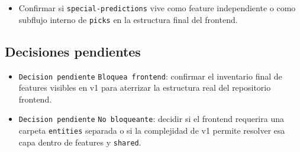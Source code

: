\begin{itemize}
  \item Confirmar si \texttt{special-predictions} vive como feature independiente o como subflujo interno de \texttt{picks} en la estructura final del frontend.
\end{itemize}

\subsection{Decisiones pendientes}

\begin{itemize}
  \item \texttt{Decision pendiente} \texttt{Bloquea frontend}: confirmar el inventario final de features visibles en v1 para aterrizar la estructura real del repositorio frontend.
  \item \texttt{Decision pendiente} \texttt{No bloqueante}: decidir si el frontend requerira una carpeta \texttt{entities} separada o si la complejidad de v1 permite resolver esa capa dentro de features y \texttt{shared}.
\end{itemize}
